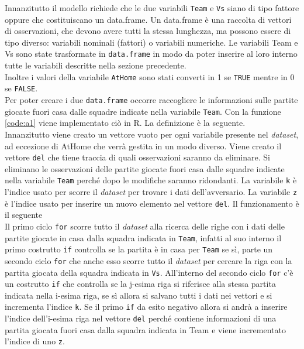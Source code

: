 Innanzitutto il modello richiede che le due variabili \texttt{Team} e \texttt{Vs} siano di tipo fattore oppure che costituiscano un \textsf{data.frame}. Un \textsf{data.frame} è una raccolta di vettori di osservazioni, che devono avere tutti la stessa lunghezza, ma possono essere di tipo diverso: variabili nominali (fattori) o variabili numeriche.
Le variabili \textsf{Team} e \textsf{Vs} sono state trasformate in \texttt{data.frame} in modo da poter inserire al loro interno tutte le variabili descritte nella sezione precedente.\\
Inoltre i valori della variabile \texttt{AtHome} sono stati converti in 1 se \texttt{TRUE} mentre in 0 se \texttt{FALSE}.\\
Per poter creare i due \texttt{data.frame} occorre raccogliere le informazioni sulle partite giocate fuori casa dalle squadre indicate nella variabile \texttt{Team}. Con la funzione \ref{code:a1} viene implementato ciò in R. La definizione è la seguente.\\
Innanzitutto viene creato un vettore vuoto per ogni variabile presente nel \emph{dataset}, ad eccezione di \textsf{AtHome} che verrà gestita in un modo diverso. Viene creato il vettore \texttt{del} che tiene traccia di quali osservazioni saranno da eliminare. Si eliminano le osservazioni delle partite giocate fuori casa dalle squadre indicate nella variabile \texttt{Team} perché dopo le modifiche saranno ridondanti. La variabile \texttt{k} è l'indice usato per scorre il \emph{dataset} per trovare i dati dell'avversario. La variabile \texttt{z} è l'indice usato per inserire un nuovo elemento nel vettore \texttt{del}. Il funzionamento è il seguente\\
Il primo ciclo \texttt{for} scorre tutto il \emph{dataset} alla ricerca delle righe con i dati delle partite giocate in casa dalla squadra indicata in \texttt{Team}, infatti al suo interno il primo costrutto \texttt{if} controlla se la partita è in casa per \texttt{Team} se sì, parte un secondo ciclo \texttt{for} che anche esso scorre tutto il \emph{dataset} per cercare la riga con la partita giocata della squadra indicata in \texttt{Vs}. All'interno del secondo ciclo \texttt{for} c'è un costrutto \texttt{if} che controlla se la j-esima riga si riferisce alla stessa partita indicata nella i-esima riga, se sì allora si salvano tutti i dati nei vettori e si incrementa l'indice \texttt{k}. Se il primo \texttt{if} da esito negativo allora si andrà a inserire l'indice dell'i-esima riga nel vettore \texttt{del} perché contiene informazioni di una partita giocata fuori casa dalla squadra indicata in \textsf{Team} e viene incrementato l'indice di uno \texttt{z}.\\

